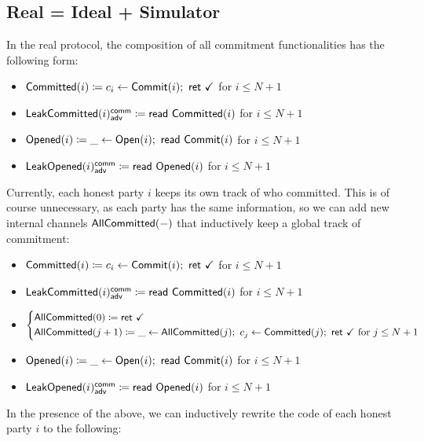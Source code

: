 \subsection{Real = Ideal + Simulator}
In the real protocol, the composition of all commitment functionalities has the following form:

\begin{itemize}
\item {\color{magenta} $\mathsf{Committed}(i) \coloneqq c_i \leftarrow \mathsf{Commit}(i); \ \mathsf{ret} \ \checkmark$ for $i \leq N+1$}
\item {\color{magenta} $\mathsf{LeakCommitted}(i)^{\mathsf{comm}}_{\mathsf{adv}} \coloneqq \mathsf{read} \ \mathsf{Committed}(i)$ for $i \leq N+1$}
\item {\color{red} $\mathsf{Opened}(i) \coloneqq \_ \leftarrow \mathsf{Open}(i); \ \mathsf{read} \ \mathsf{Commit}(i)$ for $i \leq N+1$}
\item {\color{red} $\mathsf{LeakOpened}(i)^{\mathsf{comm}}_{\mathsf{adv}} \coloneqq \mathsf{read} \ \mathsf{Opened}(i)$ for $i \leq N+1$}
\end{itemize}

\noindent Currently, each honest party $i$ keeps its own track of who committed. This is of course unnecessary, as each party has the same information, so we can add new internal channels $\mathsf{AllCommitted}(-)$ that inductively keep a global track of commitment:

\begin{itemize}
\item {\color{magenta} $\mathsf{Committed}(i) \coloneqq c_i \leftarrow \mathsf{Commit}(i); \ \mathsf{ret} \ \checkmark$ for $i \leq N+1$}
\item {\color{magenta} $\mathsf{LeakCommitted}(i)^{\mathsf{comm}}_{\mathsf{adv}} \coloneqq \mathsf{read} \ \mathsf{Committed}(i)$ for $i \leq N+1$}
\item {\color{magenta} $\begin{cases*} \AllCommitted(0) \coloneqq \ret{\checkmark} \\ \AllCommitted(j+1) \coloneqq \_ \leftarrow \AllCommitted(j); \ c_j \leftarrow \Committed(j); \ \ret{\checkmark} \text{ for $j \leq N+1$} \end{cases*}$}
\item {\color{red} $\mathsf{Opened}(i) \coloneqq \_ \leftarrow \mathsf{Open}(i); \ \mathsf{read} \ \mathsf{Commit}(i)$ for $i \leq N+1$}
\item {\color{red} $\mathsf{LeakOpened}(i)^{\mathsf{comm}}_{\mathsf{adv}} \coloneqq \mathsf{read} \ \mathsf{Opened}(i)$ for $i \leq N+1$}
\end{itemize}

\noindent In the presence of the above, we can inductively rewrite the code of each honest party $i$ to the following:

